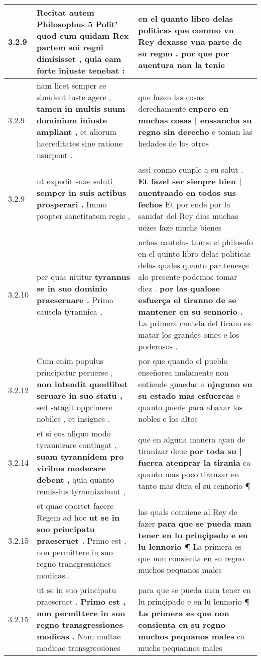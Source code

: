 \begin{tabular}{|p{1cm}|p{6.5cm}|p{6.5cm}|}
3.2.9 & Recitat autem Philosophus 5 Polit’ \textbf{ quod cum quidam Rex partem sui regni dimisisset , } quia eam forte iniuste tenebat : & en el quanto libro delas politicas \textbf{ que commo vn Rey dexasse vna parte de su regno . } por que por auentura non la tenie \\\hline
3.2.9 & nam licet semper se simulent iuste agere , \textbf{ tamen in multis suum dominium iniuste ampliant , } et aliorum haereditates sine ratione usurpant . & que fazen las cosas derechamente \textbf{ enpero en muchas cosas | enssancha su regno sin derecho } e toman las hedades de los otros \\\hline
3.2.9 & ut expedit suae saluti \textbf{ semper in suis actibus prosperari . } Immo propter sanctitatem regis , & assi conmo cunple a su salut . \textbf{ Et fazel ser sienpre bien | auentraado en todos sus fechos } Et por ende por la sanidat del Rey dios muchas uezes faze muchs bienes \\\hline
3.2.10 & per quas nititur \textbf{ tyrannus se in suo dominio praeseruare . } Prima cautela tyrannica , & nchas cautelas tanne el philosofo en el quinto libro delas politicas delas quales quanto par tenesçe alo presente podemos tomar diez . \textbf{ por las qualose esfuerça el tiranno de se mantener en su sennorio . } La primera cautela del tirano es matar los grandes omes e los poderosos . \\\hline
3.2.12 & Cum enim populus principatur peruerse , \textbf{ non intendit quodlibet seruare in suo statu , } sed satagit opprimere nobiles , et insignes . & por que quando el pueblo enseñorea malamente non entiende guaedar a \textbf{ njnguno en su estado mas esfuercas } e quanto puede para abaxar los nobles e los altos \\\hline
3.2.14 & et si eos aliquo modo tyrannizare contingat , \textbf{ suam tyrannidem pro viribus moderare debent , } quia quanto remissius tyrannizabunt , & que en alguna manera ayan de tiranizar deue \textbf{ por toda su | fuerca atenprar la tirania } ca quanto mas poco tiranzar en tanto mas dura el su sennorio ¶ \\\hline
3.2.15 & et quae oportet facere Regem ad hoc \textbf{ ut se in suo principatu praeseruet . } Primo est , non permittere in suo regno transgressiones modicas . & las quals conuiene al Rey de fazer \textbf{ para que se pueda man tener en lu prinçipado e en lu lennorio ¶ } La primera es que non consienta en su regno muchos pequanos males \\\hline
3.2.15 & ut se in suo principatu praeseruet . \textbf{ Primo est , non permittere in suo regno transgressiones modicas . } Nam multae modicae transgressiones & para que se pueda man tener en lu prinçipado e en lu lennorio ¶ \textbf{ La primera es que non consienta en su regno muchos pequanos males } ca muchs pequannos males \\\hline

\end{tabular}
